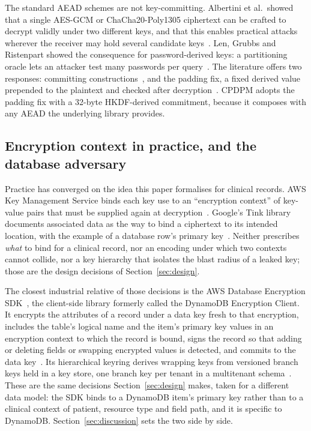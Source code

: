 The standard AEAD schemes are not key-committing. Albertini et al.\ showed that a single AES-GCM or ChaCha20-Poly1305 ciphertext can be crafted to decrypt validly under two different keys, and that this enables practical attacks wherever the receiver may hold several candidate keys~\cite{albertini2022commitment}. Len, Grubbs and Ristenpart showed the consequence for password-derived keys: a partitioning oracle lets an attacker test many passwords per query~\cite{len2021partitioning}. The literature offers two responses: committing constructions~\cite{grubbs2017franking,bellare2022committing}, and the padding fix, a fixed derived value prepended to the plaintext and checked after decryption~\cite{albertini2022commitment}. CPDPM adopts the padding fix with a 32-byte HKDF-derived commitment, because it composes with any AEAD the underlying library provides.

\subsection{Encryption context in practice, and the database adversary}
\label{sec:practice}

Practice has converged on the idea this paper formalises for clinical records. AWS Key Management Service binds each key use to an ``encryption context'' of key-value pairs that must be supplied again at decryption~\cite{aws-kms-context}. Google's Tink library documents associated data as the way to bind a ciphertext to its intended location, with the example of a database row's primary key~\cite{tink-aead}. Neither prescribes \emph{what} to bind for a clinical record, nor an encoding under which two contexts cannot collide, nor a key hierarchy that isolates the blast radius of a leaked key; those are the design decisions of Section~\ref{sec:design}.

The closest industrial relative of those decisions is the AWS Database Encryption SDK~\cite{aws-dbesdk}, the client-side library formerly called the DynamoDB Encryption Client. It encrypts the attributes of a record under a data key fresh to that encryption, includes the table's logical name and the item's primary key values in an encryption context to which the record is bound, signs the record so that adding or deleting fields or swapping encrypted values is detected, and commits to the data key~\cite{aws-dbesdk-concepts}. Its hierarchical keyring derives wrapping keys from versioned branch keys held in a key store, one branch key per tenant in a multitenant schema~\cite{aws-dbesdk-hierarchical}. These are the same decisions Section~\ref{sec:design} makes, taken for a different data model: the SDK binds to a DynamoDB item's primary key rather than to a clinical context of patient, resource type and field path, and it is specific to DynamoDB. Section~\ref{sec:discussion} sets the two side by side.

